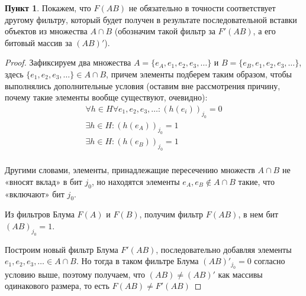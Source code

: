 \documentclass[11pt,a4paper]{scrarticle}
\theoremstyle{definition}
\newtheorem{subtask}{Пункт}
\begin{document}
\begin{subtask}
    Покажем, что $F(AB)$ не обязательно в точности соответствует другому фильтру, который будет получен в результате последовательной вставки объектов из множества $A \cap B$ (обозначим такой фильтр за $F'(AB)$, а его битовый массив за $(AB)'$).

    \begin{proof}
        Зафиксируем два множества $A = \{e_A, e_1, e_2, e_3, \dots\}$ и $B = \{e_B, e_1, e_2, e_3, \dots\}$, здесь \linebreak $\{e_1, e_2, e_3, \dots\} \in A \cap B$, причем элементы подберем таким образом, чтобы выполнялись дополнительные условия (оставим вне рассмотрения причину, почему такие элементы вообще существуют, очевидно):
        \begin{align*}
            \forall h \in H \forall e_1, e_2, e_3, \dots \colon (h(e_i))_{j_0} = 0 \\
            \exists h \in H \colon (h(e_A))_{j_0} = 1                              \\
            \exists h \in H \colon (h(e_B))_{j_0} = 1                              \\
        \end{align*}

        Другими словами, элементы, принадлежащие пересечению множеств $A \cap B$ не «вносят вклад» в бит $j_0$, но находятся элементы $e_A, e_B \notin A \cap B$ такие, что «включают» бит $j_0$.

        Из фильтров Блума $F(A)$ и $F(B)$, получим фильтр $F(AB)$, в нем бит $(AB)_{j_0} = 1$.

        Построим новый фильтр Блума $F'(AB)$, последовательно добавляя элементы $e_1, e_2, e_3, \dots \in A \cap B$. Но тогда в таком фильтре Блума $(AB)'_{j_0} = 0$ согласно условию выше, поэтому получаем, что $(AB) \neq (AB)'$ как массивы одинакового размера, то есть $F(AB) \neq F'(AB)$
    \end{proof}
\end{subtask}
\end{document}
